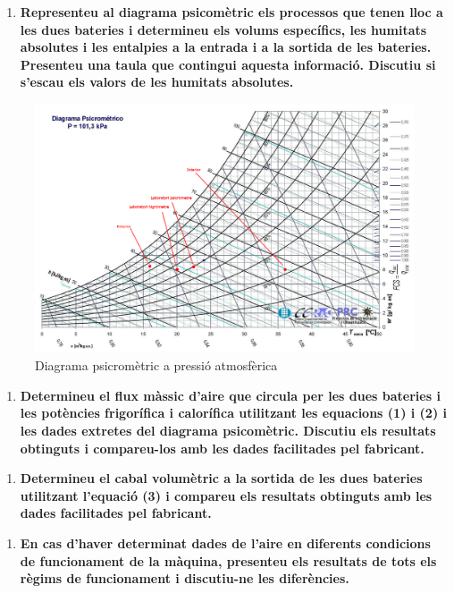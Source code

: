\documentclass[a4paper]{article}
\newenvironment{questionenum}{%
	\setlist[enumerate]{resume}
	\restartlist{enumerate}
	\newcommand{\question}[1]{
		\begin{enumerate}
			\item\bfseries ##1
		\end{enumerate}
}}{%
}
\begin{document}
\begin{questionenum}
	\question{Representeu al diagrama psicomètric els processos que tenen lloc a les dues bateries i determineu els volums específics, les humitats absolutes i les entalpies a la entrada i a la sortida de les bateries. Presenteu una taula que contingui aquesta informació. Discutiu si s'escau els valors de les humitats absolutes.}
    
    \begin{figure}[H]
        \centering
        \includegraphics[width=\textwidth]{images/psychrometric}
        \caption{Diagrama psicromètric a pressió atmosfèrica}
    \end{figure}
	
	\question{Determineu el flux màssic d'aire que circula per les dues bateries i les potències frigorífica i calorífica utilitzant les equacions (1) i (2) i les dades extretes del diagrama psicomètric. Discutiu els resultats obtinguts i compareu-los amb les dades facilitades pel fabricant.}
	
	\question{Determineu el cabal volumètric a la sortida de les dues bateries utilitzant l'equació (3) i compareu els resultats obtinguts amb les dades facilitades pel fabricant.}
	
	\question{En cas d'haver determinat dades de l'aire en diferents condicions de funcionament de la màquina, presenteu els resultats de tots els règims de funcionament i discutiu-ne les diferències.}
\end{questionenum}
\end{document}
